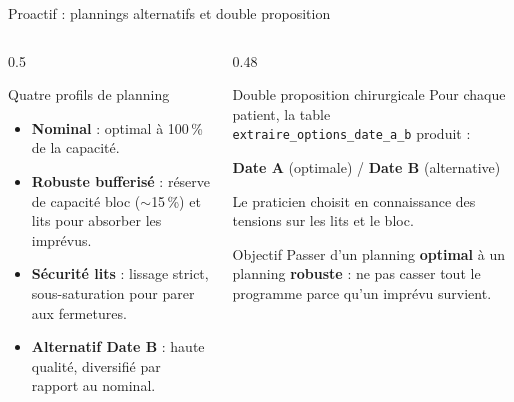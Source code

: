 \begin{frame}{Proactif : plannings alternatifs et double proposition}
  \small
  \begin{columns}[T,onlytextwidth]
    \begin{column}{0.5\textwidth}
      \begin{block}{Quatre profils de planning}
        \begin{itemize}
          \item \textbf{Nominal} : optimal à 100\,\% de la capacité.
          \item \textbf{Robuste bufferisé} : réserve de capacité bloc
            ($\sim$15\,\%) et lits pour absorber les imprévus.
          \item \textbf{Sécurité lits} : lissage strict, sous-saturation pour
            parer aux fermetures.
          \item \textbf{Alternatif Date B} : haute qualité, diversifié par
            rapport au nominal.
        \end{itemize}
      \end{block}
    \end{column}
    \begin{column}{0.48\textwidth}
      \begin{exampleblock}{Double proposition chirurgicale}
        \footnotesize Pour chaque patient, la table
        \texttt{extraire\_options\_date\_a\_b} produit :
        \begin{center}
          \textbf{Date A} (optimale) \quad / \quad \textbf{Date B}
          (alternative)
        \end{center}
        Le praticien choisit en connaissance des tensions sur les lits et le
        bloc.
      \end{exampleblock}
      \begin{alertblock}{Objectif}
        \footnotesize Passer d'un planning \textbf{optimal} à un planning
        \textbf{robuste} : ne pas casser tout le programme parce qu'un imprévu
        survient.
      \end{alertblock}
    \end{column}
  \end{columns}
\end{frame}

